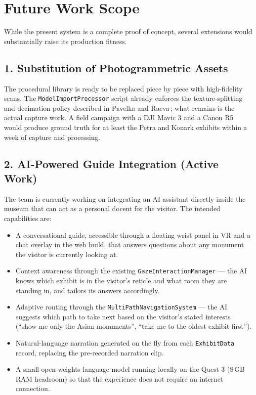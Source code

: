 \section{Future Work Scope}

While the present system is a complete proof of concept, several extensions would substantially raise its production fitness.

\subsection{1. Substitution of Photogrammetric Assets}

The procedural library is ready to be replaced piece by piece with high-fidelity scans. The \texttt{ModelImportProcessor} script already enforces the texture-splitting and decimation policy described in Pavelka and Raeva\,\cite{pavelka2019}; what remains is the actual capture work. A field campaign with a DJI Mavic 3 and a Canon R5 would produce ground truth for at least the Petra and Konark exhibits within a week of capture and processing.

\subsection{2. AI-Powered Guide Integration (Active Work)}

The team is currently working on integrating an AI assistant directly inside the museum that can act as a personal docent for the visitor. The intended capabilities are:

\begin{itemize}
\item A conversational guide, accessible through a floating wrist panel in VR and a chat overlay in the web build, that answers questions about any monument the visitor is currently looking at.
\item Context awareness through the existing \texttt{GazeInteractionManager} --- the AI knows which exhibit is in the visitor's reticle and what room they are standing in, and tailors its answers accordingly.
\item Adaptive routing through the \texttt{MultiPathNavigationSystem} --- the AI suggests which path to take next based on the visitor's stated interests (``show me only the Asian monuments'', ``take me to the oldest exhibit first'').
\item Natural-language narration generated on the fly from each \texttt{ExhibitData} record, replacing the pre-recorded narration clip.
\item A small open-weights language model running locally on the Quest 3 (8\,GB RAM headroom) so that the experience does not require an internet connection.
\end{itemize}

